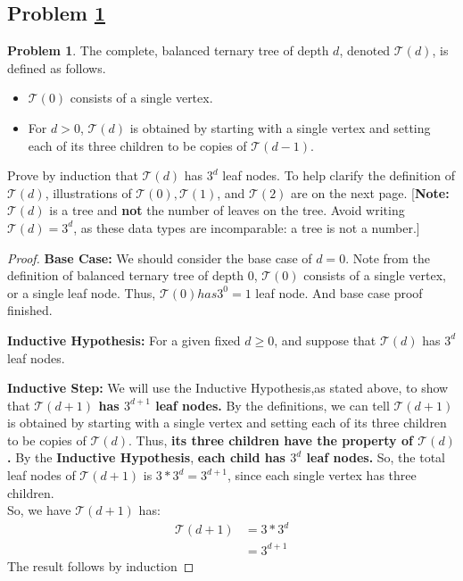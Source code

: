 \documentclass[11pt]{article}
\theoremstyle{definition}
\theoremstyle{definition}
\newtheorem{required}{Problem}
\theoremstyle{definition}
\begin{document}
\subsection{Problem \ref{Induction3}}
\begin{required} \label{Induction3}
The complete, balanced ternary tree of depth $d$, denoted $\mathcal{T}(d)$, is defined as follows. 
\begin{itemize}
\item $\mathcal{T}(0)$ consists of a single vertex.
\item For $d > 0$, $\mathcal{T}(d)$ is obtained by starting with a single vertex and setting each of its three children to be copies of $\mathcal{T}(d-1)$.
\end{itemize}

\noindent Prove by induction that $\mathcal{T}(d)$ has $3^{d}$ leaf nodes. To help clarify the definition of $\mathcal{T}(d)$, illustrations of $\mathcal{T}(0), \mathcal{T}(1)$, and $\mathcal{T}(2)$ are on the next page. [\textbf{Note:} $\mathcal{T}(d)$ is a tree and \textbf{not} the number of leaves on the tree. Avoid writing $\mathcal{T}(d) = 3^{d}$, as these data types are incomparable: a tree is not a number.]
\end{required}

\begin{proof}
\item \textbf{Base Case:} We should consider the base case of $d=0$. Note from the definition of balanced ternary tree of depth 0, $\mathcal{T}(0)$ consists of a single vertex, or a single leaf node. Thus, $\mathcal{T}(0) has 3^0 = 1$ leaf node. And base case proof finished.\\

\item \textbf{Inductive Hypothesis:} For a given fixed $d \geq 0$, and suppose that $\mathcal{T}(d)$ has $3^{d}$ leaf nodes. \\

\item \textbf{Inductive Step:} We will use the Inductive Hypothesis,as stated above, to show that \textbf{ $\mathcal{T}(d+1)$ has $3^{d+1}$ leaf nodes.} By the definitions, we can tell  $\mathcal{T}(d+1)$ is obtained by starting with a single vertex and setting each of its three children to be copies of $\mathcal{T}(d)$. Thus, \textbf{its three children have the property of $\mathcal{T}(d)$.} By the \textbf{Inductive Hypothesis}, \textbf{each child has $3^d$ leaf nodes.} So, the total leaf nodes of  $\mathcal{T}(d+1)$ is $3*3^d = 3^{d+1}$, since each single vertex has three children.\\
So, we have $\mathcal{T}(d+1)$ has:
\begin{align*}
\mathcal{T}(d+1) &= 3*3^d\\
&= 3^{d+1}
\end{align*}
The result follows by induction
\end{proof}
\end{document}
